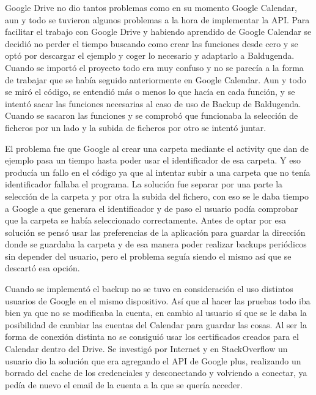 Google Drive no dio tantos problemas como en su momento Google Calendar, aun y todo se tuvieron algunos problemas a la hora de implementar la API.
Para facilitar el trabajo con Google Drive y habiendo aprendido de Google Calendar se decidió no perder el tiempo buscando como crear las funciones desde cero y se optó por descargar el ejemplo y coger lo necesario y adaptarlo a Baldugenda.
Cuando se importó el proyecto todo era muy confuso y no se parecía a la forma de trabajar que se había seguido anteriormente en Google Calendar.
Aun y todo se miró el código, se entendió más o menos lo que hacía en cada función,  y se intentó sacar las funciones necesarias al caso de uso de Backup de Baldugenda.
Cuando se sacaron las funciones y se comprobó que funcionaba la selección de ficheros por un lado y la subida de ficheros por otro se intentó juntar.

El problema fue que Google al crear una carpeta mediante el \gls{activity} que dan de ejemplo pasa un tiempo hasta poder usar el identificador de esa carpeta. Y eso producía un fallo en el código ya que al intentar subir a una carpeta que no tenía identificador fallaba el programa.
La solución fue separar por una parte la selección de la carpeta y por otra la subida del fichero, con eso se le daba tiempo a Google a que generara el identificador y de paso el usuario podía comprobar que la carpeta se había seleccionado correctamente.
Antes de optar por esa solución se pensó usar las preferencias de la aplicación para guardar la dirección donde se guardaba la carpeta y de esa manera poder realizar backups periódicos sin depender del usuario, pero el problema seguía siendo el mismo así que se descartó esa opción.

Cuando se implementó el backup no se tuvo en consideración el uso distintos usuarios de Google en el mismo dispositivo. Así que al hacer las pruebas todo iba bien ya que no se modificaba la cuenta, en cambio al usuario sí que se le daba la posibilidad de cambiar las cuentas del Calendar para guardar las cosas. Al ser la forma de conexión distinta no se consiguió usar los certificados creados para el Calendar dentro del Drive.
Se investigó por Internet y en StackOverflow un usuario dio la solución que era agregando el API de Google plus, realizando un borrado del cache de los credenciales y desconectando y volviendo a conectar, ya pedía de nuevo el email de la cuenta a la que se quería acceder.

